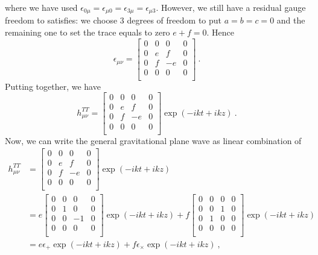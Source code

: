     where we have used $\epsilon_{0 \mu} = \epsilon_{\mu 0} = \epsilon_{3\mu} = \epsilon_{\mu 3}$. However, we still have a residual gauge freedom to satisfies: we choose $3$ degrees of freedom to put $a = b = c = 0$ and the remaining one to set the trace equals to zero $e + f = 0$. Hence 
    \begin{equation*}
        \epsilon_{\mu\nu} = \begin{bmatrix}
            0 & 0 & 0 & 0 \\
            0 & e & f & 0 \\
            0 & f & -e & 0 \\
            0 & 0 & 0 & 0 \\
        \end{bmatrix} ~.
    \end{equation*}
    Putting together, we have 
    \begin{equation*}
        h^{TT}_{\mu\nu} = \begin{bmatrix}
            0 & 0 & 0 & 0 \\
            0 & e & f & 0 \\
            0 & f & -e & 0 \\
            0 & 0 & 0 & 0 \\
        \end{bmatrix} \exp(- i k t + i k z) ~.
    \end{equation*}
    Now, we can write the general gravitational plane wave as linear combination of 
    \begin{equation*}
    \begin{aligned}
        h^{TT}_{\mu\nu} & = \begin{bmatrix}
            0 & 0 & 0 & 0 \\
            0 & e & f & 0 \\
            0 & f & -e & 0 \\
            0 & 0 & 0 & 0 \\
        \end{bmatrix} \exp(- i k t + i k z) \\ & = e \begin{bmatrix}
            0 & 0 & 0 & 0 \\
            0 & 1 & 0 & 0 \\
            0 & 0 & -1 & 0 \\
            0 & 0 & 0 & 0 \\
        \end{bmatrix} \exp(- i k t + i k z) + f \begin{bmatrix}
            0 & 0 & 0 & 0 \\
            0 & 0 & 1 & 0 \\
            0 & 1 & 0 & 0 \\
            0 & 0 & 0 & 0 \\
        \end{bmatrix} \exp(- i k t + i k z) \\ & = e \epsilon_+ \exp(- i k t + i k z) + f \epsilon_\times \exp(- i k t + i k z) ~,
    \end{aligned}
    \end{equation*}
